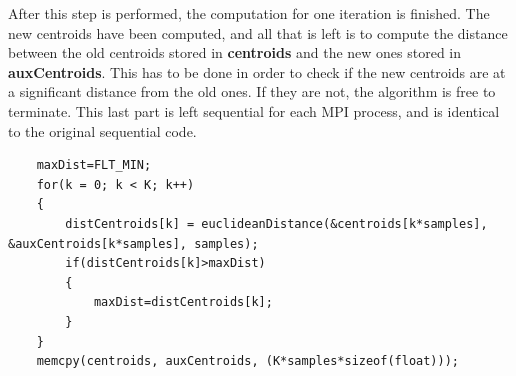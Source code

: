 \documentclass{article}
\begin{document}
After this step is performed, the computation for one iteration is finished. The new centroids have been computed, and all that is left is to compute the distance between the old centroids stored in \textbf{centroids} and the new ones stored in \textbf{auxCentroids}. This has to be done in order to check if the new centroids are at a significant distance from the old ones. If they are not, the algorithm is free to terminate. This last part is left sequential for each MPI process, and is identical to the original sequential code. 
\begin{lstlisting}
    maxDist=FLT_MIN;
    for(k = 0; k < K; k++)
    {
        distCentroids[k] = euclideanDistance(&centroids[k*samples], &auxCentroids[k*samples], samples);
        if(distCentroids[k]>maxDist)
        {
            maxDist=distCentroids[k];
        }
    }
    memcpy(centroids, auxCentroids, (K*samples*sizeof(float)));
\end{lstlisting}
\end{document}
